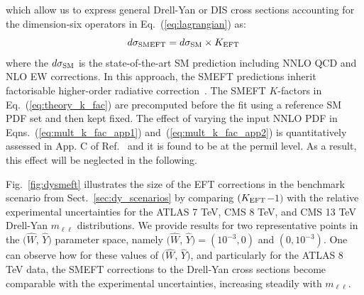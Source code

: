 \documentclass[withindex,glossary]{cam-thesis}
\begin{document}
  which allow us to express general Drell-Yan or DIS cross sections accounting for
  the dimension-six operators in Eq.~(\ref{eq:lagrangian}) as:
\begin{equation}
  \label{eq:theory_k_fac_app3}
  d\sigma_{\rm SMEFT} = d\sigma_{\rm SM}
  \times  K_{\rm EFT} \, 
\end{equation}
where the $ d\sigma_{\rm SM}$ is the state-of-the-art SM prediction
including NNLO QCD and NLO EW corrections.
%
In this approach, the SMEFT predictions inherit factorisable higher-order radiative correction~\cite{Greljo:2017vvb,Ricci:2020xre}. 
%
%
The SMEFT $K$-factors in Eq.~(\ref{eq:theory_k_fac}) are
precomputed before the fit using a reference SM PDF set and then kept fixed.
%
The effect of varying the input NNLO PDF in
Eqns.~(\ref{eq:mult_k_fac_app1}) and~(\ref{eq:mult_k_fac_app2})
is quantitatively assessed in App. C of Ref.~\cite{Greljo:2021kvv} and it
is found to be at the permil level.
As a result, this effect will be neglected in the following.

Fig.~\ref{fig:dysmeft} illustrates the size of the EFT corrections in
the benchmark scenario from Sect.~\ref{sec:dy_scenarios} by comparing
$(K_{\rm EFT}$$-$$1)$
with the relative experimental
  uncertainties  for the ATLAS 7 TeV, CMS 8 TeV,
  and CMS 13 TeV Drell-Yan $m_{\ell\ell}$ distributions.
  We provide results for two representative points in the $(\hat{W}$, $\hat{Y})$
  parameter space, namely $(\hat{W}$, $\hat{Y})=(10^{-3},0)$ and $(0,10^{-3})$.
  One can observe how for these values of $(\hat{W}$, $\hat{Y})$, 
and particularly for the ATLAS 8 TeV data, the SMEFT corrections
  to the Drell-Yan cross sections become comparable with the experimental uncertainties, 
  increasing steadily with $m_{\ell\ell}$.
\end{document}
